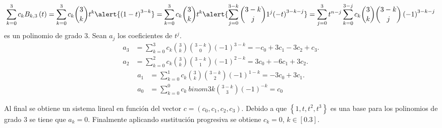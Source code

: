 \begin{frame}
\begin{solution}
        \begin{equation*}
            \sum_{k=0}^{3}
            c_{k}
            B_{k,3}\left(t\right)=
            \sum_{k=0}^{3}
            c_{k}
            \binom{3}{k}
            t^{k}
            \alert{
                {\left(1-t\right)}^{3-k}
            }=
            \sum_{k=0}^{3}
            c_{k}\binom{3}{k}t^k
            \alert{
                \sum_{j=0}^{3-k}
                \binom{3-k}{j}
                1^{j}
                    {\left(-t\right)}^{3-k-j}
            }=
            \sum_{j=0}^{3}
            t^{n-j}
            \sum_{k=0}^{3-j}
            c_{k}
            \binom{3}{k}
            \binom{3-k}{j}
            \left(-1\right)^{3-k-j}
        \end{equation*}
        es un polinomio de grado $3$.
        Sean $a_{j}$ los coeficientes de $t^{j}$.
        \begin{align*}
            a_{3} & =
            \sum_{k=0}^{3}
            c_{k}
            \binom{3}{k}
            \binom{3-k}{0}
            {\left(-1\right)}^{3-k}=
            -c_{0}+3c_{1}-3c_{2}+c_{3}. \\
            a_{2} & =
            \sum_{k=0}^{2}
            c_{k}
            \binom{3}{k}
            \binom{3-k}{1}
            {\left(-1\right)}^{2-k}=
            3c_{0}+-6c_{1}+3c_{2}.
        \end{align*}
        \begin{align*}
            a_{1} & =
            \sum_{k=0}^{1}
            c_{k}
            \binom{3}{k}
            \binom{3-k}{2}
            {\left(-1\right)}^{1-k}=
            -3c_{0}+3c_{1}. \\
            a_{0} & =
            \sum_{k=0}^{0}
            c_{k}\
            binom{3}{k}
            \binom{3-k}{3}
            {\left(-1\right)}^{-k}=
            c_{0}
        \end{align*}
    \end{solution}
\end{frame}

\begin{frame}
    \begin{solution}
        Al final se obtiene un sistema lineal en función del vector $c=(c_0,c_1,c_2,c_3)$.
        Debido a que $\left\{1,t,t^{2},t^{3}\right\}$ es una base para los polinomios de grado $3$ se tiene que $a_k=0$.
        Finalmente aplicando sustitución progresiva se obtiene $c_{k}=0$, $k\in[0.3]$.
    \end{solution}
\end{frame}
